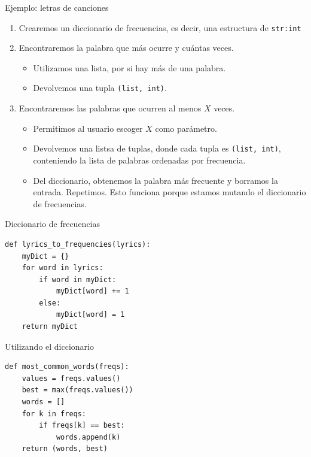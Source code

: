 \documentclass[mathserif]{beamer}
\begin{document}
\begin{frame}[fragile]{Ejemplo: letras de canciones}
    \begin{enumerate}
        \item Crearemos un diccionario de frecuencias, es decir, una estructura de \lstinline|str:int|
        
        \item Encontraremos la palabra que más ocurre y cuántas veces.
        \begin{itemize}
            \item Utilizamos una lista, por si hay más de una palabra.
            \item Devolvemos una tupla \lstinline|(list, int)|.
        \end{itemize}
        
        \item Encontraremos las palabras que ocurren al menos $X$ veces.
        \begin{itemize}
            \item Permitimos al usuario escoger $X$ como parámetro.
            \item Devolvemos una listsa de tuplas, donde cada tupla es \lstinline|(list, int)|, conteniendo la lista de palabras ordenadas por frecuencia.
            \item Del diccionario, obtenemos la palabra más frecuente y borramos la entrada. Repetimos. Esto funciona porque estamos {\blue mutando} el diccionario de frecuencias.
        \end{itemize}
    \end{enumerate}
\end{frame}


\begin{frame}[fragile]{Diccionario de frecuencias}
\begin{lstlisting}
def lyrics_to_frequencies(lyrics):
    myDict = {}
    for word in lyrics:
        if word in myDict:
            myDict[word] += 1
        else:
            myDict[word] = 1
    return myDict
\end{lstlisting}
\end{frame}

\begin{frame}[fragile]{Utilizando el diccionario}
\begin{lstlisting}
def most_common_words(freqs):
    values = freqs.values()
    best = max(freqs.values())
    words = []
    for k in freqs:
        if freqs[k] == best:
            words.append(k)
    return (words, best)
\end{lstlisting}
\end{frame}
\end{document}
